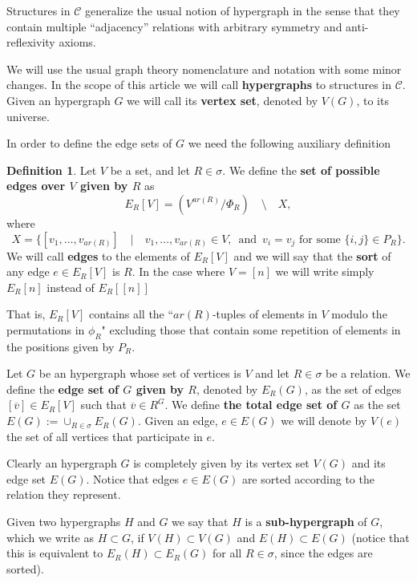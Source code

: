 \documentclass[12pt,notitlepage,a4paper]{article}
\theoremstyle{definition}
\newtheorem{definition}{Definition}[section]
\begin{document}
Structures in $\mathcal{C}$ generalize the usual notion of hypergraph
in the sense that they contain multiple ``adjacency'' relations with arbitrary 
symmetry and anti-reflexivity axioms. \par
We will use the usual graph theory nomenclature and notation with some minor changes. 
In the scope of this article we will call \textbf{hypergraphs}
to structures in $\mathcal{C}$.
Given an hypergraph $G$ we will call its \textbf{vertex set}, denoted by $V(G)$,
to its universe.\par
In order to define the edge sets of $G$ we need the following auxiliary definition
\begin{definition} 
	Let $V$ be a set, and let $R\in \sigma$.
	We define the \textbf{set of possible edges over $V$
	given by $R$} as
	\[ E_R[V]= (V^{ar(R)}/\Phi_R) \quad \setminus 
	\quad X, \]
	where
	\[
	X=
	\Big\{ [v_1,\dots,v_{ar(R)}]  
	\quad \Big| \quad
	v_1,\dots,v_{ar(R)}\in V, \,
	\text{ and } 
	 \, v_i=v_j \text{ for some } 
	\{i,j\}\in P_R \Big\}.
	\]
	We will call \textbf{edges} to the elements of
	$E_R[V]$ and we will say that the \textbf{sort} of any edge $e\in E_R[V]$
	is $R$.	In the case where $V=[n]$ we will write simply $E_R[n]$ instead
	of $E_R[[n]]$
\end{definition}

That is, $E_R[V]$ contains all the ``$ar(R)$-tuples of elements
in $V$ modulo the permutations
in $\phi_R$" 
excluding those that contain some repetition of elements in
the positions given by $P_R$.\par
Let $G$ be an hypergraph whose set of vertices is $V$ and let $R\in \sigma$
be a relation. 
We define the \textbf{edge set of $G$ given by $R$}, denoted by $E_R(G)$, 
as the set of edges $[\overline{v}]\in E_R[V]$ such that $\overline{v}\in R^G$. 
We define \textbf{the total edge set of $G$} as the set $E(G):=\cup_{R\in \sigma} E_R(G)$.
Given an edge, $e\in E(G)$ we will denote by $V(e)$
the set of all vertices that participate in $e$. 
\par
Clearly an hypergraph $G$ is completely given by its vertex set $V(G)$ and its edge 
set $ E(G)$. Notice that edges $e\in E(G)$ are sorted according to the relation they represent.
\par

Given two hypergraphs $H$ and $G$ we say that $H$
is a \textbf{sub-hypergraph} of $G$, which we write as $H\subset G$,
if $V(H)\subset V(G)$ and $E(H)\subset E(G)$ (notice 
that this is equivalent to $E_R(H)\subset E_R(G)$ for all
$R\in \sigma$, since the edges are sorted).\par
\end{document}

